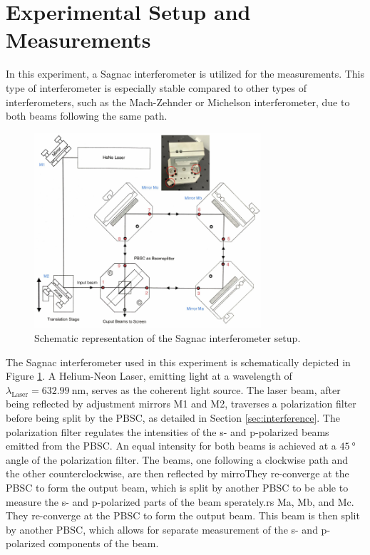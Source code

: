 \section{Experimental Setup and Measurements}
\label{sec:procedure}
In this experiment, a Sagnac interferometer is utilized for the measurements. 
This type of interferometer is especially stable compared to other types
of interferometers, such as the Mach-Zehnder or Michelson interferometer, due to
both beams following the same path.

\begin{figure}
    \centering
    \includegraphics[width=0.75\textwidth]{pictures/Sagnac.png}
    \caption{Schematic representation of the Sagnac interferometer setup. \cite{V64}}
    \label{fig:sagnac}
\end{figure}

The Sagnac interferometer used in this experiment is schematically depicted in Figure \ref{fig:sagnac}. 
A Helium-Neon Laser, emitting light at a wavelength of $\lambda_\text{Laser} = \SI{632.99}{\nano\meter}$, 
serves as the coherent light source. The laser beam, after being reflected by adjustment mirrors M1 and M2, 
traverses a polarization filter before being split by the PBSC, as detailed 
in Section \ref{sec:interference}. The polarization filter regulates the intensities of the s- and p-polarized 
beams emitted from the PBSC. An equal intensity for both beams is achieved at a $\SI{45}{\degree}$ angle 
of the polarization filter. The beams, one following a clockwise path and the other counterclockwise, are 
then reflected by mirroThey re-converge at the PBSC to form the output beam, 
which is split by another PBSC to be able to measure 
the s- and p-polarized parts of the beam sperately.rs Ma, Mb, and Mc. 
They re-converge at the PBSC to form the output beam. 
This beam is then split by another PBSC, 
which allows for separate measurement of the s- and p-polarized components of the beam.


